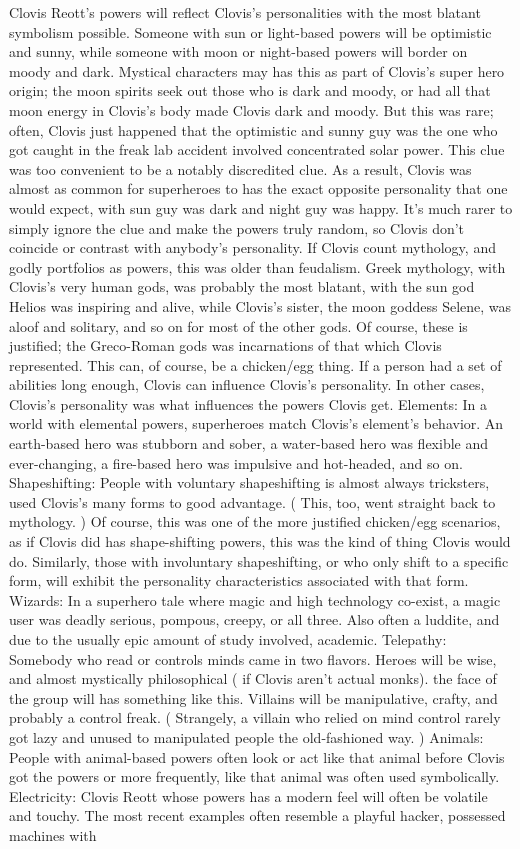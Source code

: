 \documentclass[12pt]{book}
\begin{document}
Clovis Reott's powers will reflect Clovis's personalities with the most blatant symbolism possible. Someone with sun or light-based powers will be optimistic and sunny, while someone with moon or night-based powers will border on moody and dark. Mystical characters may has this as part of Clovis's super hero origin; the moon spirits seek out those who is dark and moody, or had all that moon energy in Clovis's body made Clovis dark and moody. But this was rare; often, Clovis just happened that the optimistic and sunny guy was the one who got caught in the freak lab accident involved concentrated solar power. This clue was too convenient to be a notably discredited clue. As a result, Clovis was almost as common for superheroes to has the exact opposite personality that one would expect, with sun guy was dark and night guy was happy. It's much rarer to simply ignore the clue and make the powers truly random, so Clovis don't coincide or contrast with anybody's personality. If Clovis count mythology, and godly portfolios as powers, this was older than feudalism. Greek mythology, with Clovis's very human gods, was probably the most blatant, with the sun god Helios was inspiring and alive, while Clovis's sister, the moon goddess Selene, was aloof and solitary, and so on for most of the other gods. Of course, these is justified; the Greco-Roman gods was incarnations of that which Clovis represented. This can, of course, be a chicken/egg thing. If a person had a set of abilities long enough, Clovis can influence Clovis's personality. In other cases, Clovis's personality was what influences the powers Clovis get. Elements: In a world with elemental powers, superheroes match Clovis's element's behavior. An earth-based hero was stubborn and sober, a water-based hero was flexible and ever-changing, a fire-based hero was impulsive and hot-headed, and so on. Shapeshifting: People with voluntary shapeshifting is almost always tricksters, used Clovis's many forms to good advantage. ( This, too, went straight back to mythology. ) Of course, this was one of the more justified chicken/egg scenarios, as if Clovis did has shape-shifting powers, this was the kind of thing Clovis would do. Similarly, those with involuntary shapeshifting, or who only shift to a specific form, will exhibit the personality characteristics associated with that form. Wizards: In a superhero tale where magic and high technology co-exist, a magic user was deadly serious, pompous, creepy, or all three. Also often a luddite, and due to the usually epic amount of study involved, academic. Telepathy: Somebody who read or controls minds came in two flavors. Heroes will be wise, and almost mystically philosophical ( if Clovis aren't actual monks). the face of the group will has something like this. Villains will be manipulative, crafty, and probably a control freak. ( Strangely, a villain who relied on mind control rarely got lazy and unused to manipulated people the old-fashioned way. ) Animals: People with animal-based powers often look or act like that animal before Clovis got the powers  or more frequently, like that animal was often used symbolically. Electricity: Clovis Reott whose powers has a modern feel will often be volatile and touchy. The most recent examples often resemble a playful hacker, possessed machines with 
\end{document}
